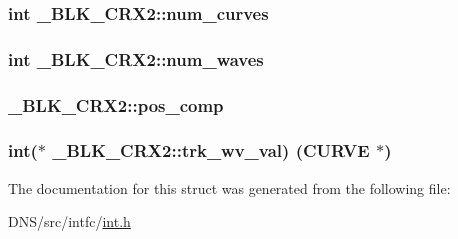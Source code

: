 \subsubsection[{\texorpdfstring{num\+\_\+curves}{num_curves}}]{\setlength{\rightskip}{0pt plus 5cm}int \+\_\+\+B\+L\+K\+\_\+\+C\+R\+X2\+::num\+\_\+curves}\hypertarget{struct___b_l_k___c_r_x2_a47c8af6c85a9d934278fc1cd8d92ce83}{}\label{struct___b_l_k___c_r_x2_a47c8af6c85a9d934278fc1cd8d92ce83}
\subsubsection[{\texorpdfstring{num\+\_\+waves}{num_waves}}]{\setlength{\rightskip}{0pt plus 5cm}int \+\_\+\+B\+L\+K\+\_\+\+C\+R\+X2\+::num\+\_\+waves}\hypertarget{struct___b_l_k___c_r_x2_a316dd4d0a552abd5b801fbdb91bc928c}{}\label{struct___b_l_k___c_r_x2_a316dd4d0a552abd5b801fbdb91bc928c}
\subsubsection[{\texorpdfstring{pos\+\_\+comp}{pos_comp}}]{ \+\_\+\+B\+L\+K\+\_\+\+C\+R\+X2\+::pos\+\_\+comp}\hypertarget{struct___b_l_k___c_r_x2_a925abab47fb42fddbf29ddeeb33392a4}{}\label{struct___b_l_k___c_r_x2_a925abab47fb42fddbf29ddeeb33392a4}
\subsubsection[{\texorpdfstring{trk\+\_\+wv\+\_\+val}{trk_wv_val}}]{\setlength{\rightskip}{0pt plus 5cm}int($\ast$ \+\_\+\+B\+L\+K\+\_\+\+C\+R\+X2\+::trk\+\_\+wv\+\_\+val) ({\bf C\+U\+R\+VE} $\ast$)}\hypertarget{struct___b_l_k___c_r_x2_af6a581f21f62bbd6a47826008dd679b6}{}\label{struct___b_l_k___c_r_x2_af6a581f21f62bbd6a47826008dd679b6}


The documentation for this struct was generated from the following file\+:\begin{DoxyCompactItemize}
\item 
D\+N\+S/src/intfc/\hyperlink{int_8h}{int.\+h}\end{DoxyCompactItemize}
